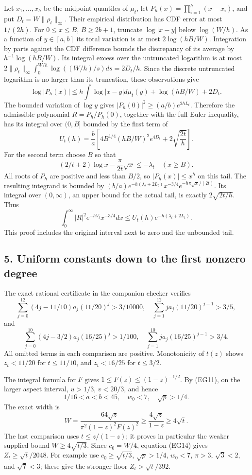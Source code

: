 \documentclass[10pt]{article}
\begin{document}
Let \(x_1,\ldots,x_h\) be the midpoint quantiles of \(\mu_t\), let \(P_h(x)=\prod_{i=1}^h(x-x_i)\), and put \(D_t=W\|\rho_t\|_\infty\). Their empirical distribution has CDF error at most \(1/(2h)\). For \(0\le x\le B\), \(B\ge2b+1\), truncate \(\log|x-y|\) below \(\log(W/h)\). As a function of \(y\in[a,b]\) its total variation is at most \(2\log(hB/W)\). Integration by parts against the CDF difference bounds the discrepancy of its average by \(h^{-1}\log(hB/W)\). Its integral excess over the untruncated logarithm is at most \(2\|\rho_t\|_\infty\int_0^{W/h}\log((W/h)/s)ds=2D_t/h\). Since the discrete untruncated logarithm is no larger than its truncation, these observations give \[
 \log|P_h(x)|\le h\int\log|x-y|d\mu_t(y)
 +\log(hB/W)+2D_t.
\] The bounded variation of \(\log y\) gives \(|P_h(0)|^2\ge(a/b)e^{2hL_t}\). Therefore the admissible polynomial \(R=P_h/P_h(0)\), together with the full Euler inequality, has its integral over \((0,B]\) bounded by the first term of \[
 U_t(h)=\frac ba\left[4B^{1/4}(hB/W)^2e^{4D_t}
 +2\sqrt{\frac{2t}{h}}\right].
 \tag{EG15}
\] For the second term choose \(B\) so that \[
 (2/t+2)\log x-\frac\pi{2t}\sqrt x\le-\lambda_t
 \quad(x\ge B).
 \tag{EG16}
\] All roots of \(P_h\) are positive and less than \(B/2\), so \(|P_h(x)|\le x^h\) on this tail. The resulting integrand is bounded by \((b/a)e^{-h(\lambda_t+2L_t)}x^{-3/4}e^{-h\pi\sqrt x/(2t)}\). Its integral over \((0,\infty)\), an upper bound for the actual tail, is exactly \(2\sqrt{2t/h}\). Thus \[
 \int_0^\infty|R|^2e^{-hV_t}x^{-3/4}dx
 \le U_t(h)e^{-h(\lambda_t+2L_t)}.
 \tag{EG17}
\] This proof includes the original interval next to zero and the unbounded tail.

\subsection{5. Uniform constants down to the first nonzero degree}\label{uniform-constants-down-to-the-first-nonzero-degree}

The exact rational certificate in the companion checker verifies \[
 \sum_{j=0}^{12}(4j-11/10)a_j(11/20)^j>3/10000,
 \quad \sum_{j=1}^{12}ja_j(11/20)^{j-1}>3/5,
\] and \[
 \sum_{j=0}^{10}(4j-3/2)a_j(16/25)^j>1/100,
 \quad \sum_{j=1}^{10}ja_j(16/25)^{j-1}>3/4.
\] All omitted terms in each comparison are positive. Monotonicity of \(t(z)\) shows \(z_t<11/20\) for \(t\le11/10\), and \(z_t<16/25\) for \(t\le3/2\).

The integral formula for \(F\) gives \(1\le F(z)\le(1-z)^{-1/2}\). By (EG11), on the larger aspect interval, \(u>1/3\), \(v<20/3\), and hence \[
 1/16<a<b<45,\quad w_0<7,\quad \sqrt p>1/4.
\] The exact width is \[
 W=\frac{64\sqrt z}{\pi^2(1-z)^2F(z)^2}
 \ge\frac{4\sqrt z}{1-z}\ge4\sqrt t.
 \tag{EG18}
\] The last comparison uses \(t\le z/(1-z)\); it proves in particular the weaker supplied bound \(W\ge4\sqrt{t/3}\). Since \(c_0=W/4\), equation (EG14) gives \(Z_t\ge\sqrt t/2048\). For example use \(c_0\ge\sqrt{t/3}\), \(\sqrt p>1/4\), \(w_0<7\), \(\pi>3\), \(\sqrt3<2\), and \(\sqrt7<3\); these give the stronger floor \(Z_t>\sqrt t/392\).
\end{document}
